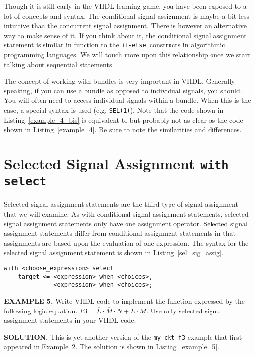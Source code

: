 Though it is still early in the VHDL learning game, you have been exposed to a lot of concepts and syntax. The conditional signal assignment is maybe a bit less intuitive than the concurrent signal assignment. There is however an alternative way to make sense of it. If you think about it, the conditional signal assignment statement is similar in function to the \texttt{if-else }constructs in algorithmic programming languages. We will touch more upon this relationship once we start talking about sequential statements.

The concept of working with bundles is very important in VHDL. Generally speaking, if you can use a bundle as opposed to individual signals, you should. You will often need to access individual signals within a bundle. When this is the case, a special syntax is used (e.g. \texttt{SEL(1)}). Note that the code shown in Listing~\ref{example_4_bis} is equivalent to but probably not as clear as the code shown in Listing~\ref{example_4}. Be sure to note the similarities and differences.

\section{Selected Signal Assignment \texttt{with select}}
Selected signal assignment statements are the third type of signal assignment that we will examine. As with conditional signal assignment statements, selected signal assignment statements only have one assignment operator. Selected signal assignment statements differ from conditional assignment statements in that assignments are based upon the evaluation of one expression. The syntax for the selected signal assignment statement is shown in Listing~\ref{sel_sig_assig}.

\noindent
\begin{minipage}{0.99\linewidth}
\begin{lstlisting}[label=sel_sig_assig, caption=Syntax for the selected signal assignment statement.]
with <choose_expression> select
	target <= <expression> when <choices>,
	          <expression> when <choices>;
\end{lstlisting}
\end{minipage}

\begin{leftbar}
\noindent
\textbf{EXAMPLE 5.}
Write VHDL code to implement the function expressed by the following logic equation: $F3=\overline{L} \cdot \overline{M} \cdot N+L \cdot M$. Use only selected signal assignment statements in your VHDL code.
\end{leftbar}
\noindent
\textbf{SOLUTION.} This is yet another version of the \texttt{my\_ckt\_f3} example that first appeared in Example~2. The solution is shown in Listing~\ref{example_5}.

